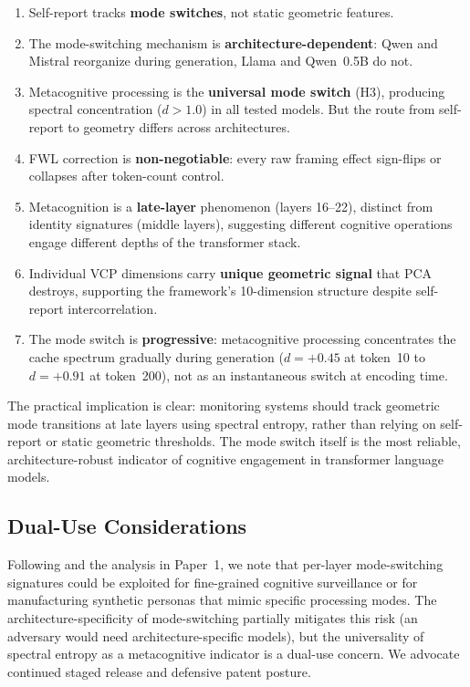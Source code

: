 \documentclass[11pt,a4paper]{article}
\begin{document}
\begin{enumerate}
    \item Self-report tracks \textbf{mode switches}, not static geometric features.
    \item The mode-switching mechanism is \textbf{architecture-dependent}: Qwen and Mistral reorganize during generation, Llama and Qwen~0.5B do not.
    \item Metacognitive processing is the \textbf{universal mode switch} (H3), producing spectral concentration ($d > 1.0$) in all tested models. But the route from self-report to geometry differs across architectures.
    \item FWL correction is \textbf{non-negotiable}: every raw framing effect sign-flips or collapses after token-count control.
    \item Metacognition is a \textbf{late-layer} phenomenon (layers 16--22), distinct from identity signatures (middle layers), suggesting different cognitive operations engage different depths of the transformer stack.
    \item Individual VCP dimensions carry \textbf{unique geometric signal} that PCA destroys, supporting the framework's 10-dimension structure despite self-report intercorrelation.
    \item The mode switch is \textbf{progressive}: metacognitive processing concentrates the cache spectrum gradually during generation ($d = +0.45$ at token~10 to $d = +0.91$ at token~200), not as an instantaneous switch at encoding time.
\end{enumerate}

The practical implication is clear: monitoring systems should track geometric mode transitions at late layers using spectral entropy, rather than relying on self-report or static geometric thresholds. The mode switch itself is the most reliable, architecture-robust indicator of cognitive engagement in transformer language models.

\subsection{Dual-Use Considerations}

Following \citet{watson2025interiora} and the analysis in Paper~1, we note that per-layer mode-switching signatures could be exploited for fine-grained cognitive surveillance or for manufacturing synthetic personas that mimic specific processing modes. The architecture-specificity of mode-switching partially mitigates this risk (an adversary would need architecture-specific models), but the universality of spectral entropy as a metacognitive indicator is a dual-use concern. We advocate continued staged release and defensive patent posture.
\end{document}
